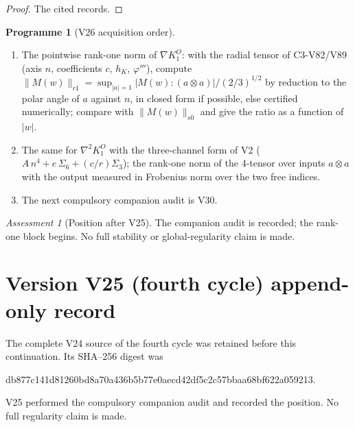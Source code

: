 \documentclass[11pt]{article}
\theoremstyle{plain}
\theoremstyle{definition}
\newtheorem{programme}[theorem]{Programme}
\theoremstyle{remark}
\newtheorem{assessment}[theorem]{Assessment}
\begin{document}
\begin{proof}
The cited records.
\end{proof}

\begin{programme}[V26 acquisition order]
\label{prog:c4v26}
\begin{enumerate}[label=\textup{(AC\arabic*)},leftmargin=4.8em]
\item The pointwise rank-one norm of \(\nabla K^O_1\): with the radial tensor of
      C3-V82/V89 (axis \(n\), coefficients \(c\), \(h_K\), \(\varphi'''\)), compute
      \(\|M(w)\|_{r1}=\sup_{|a|=1}|M(w):(a\otimes a)|/(2/3)^{1/2}\) by reduction to the polar angle of
      \(a\) against \(n\), in closed form if possible, else certified
      numerically; compare with \(\|M(w)\|_{s0}\) and give the ratio as a
      function of \(|w|\).
\item The same for \(\nabla^2K^O_1\) with the three-channel form of V2
      (\(A\,n^4+e\,\Sigma_6+(c/r)\Sigma_3\)); the rank-one norm of the 4-tensor over
      inputs \(a\otimes a\) with the output measured in Frobenius norm over
      the two free indices.
\item The next compulsory companion audit is V30.
\end{enumerate}
\end{programme}

\begin{assessment}[Position after V25]
\label{ass:c4v25-position}
The companion audit is recorded; the rank-one block begins.  No full
stability or global-regularity claim is made.
\end{assessment}

\section*{Version V25 (fourth cycle) append-only record}

The complete V24 source of the fourth cycle was retained before this
continuation.  Its SHA--256 digest was
\begin{center}\scriptsize\ttfamily
db877c141d81260bd8a70a436b5b77e0aecd42df5c2c57bbaa68bf622a059213.
\end{center}
V25 performed the compulsory companion audit and recorded the
position.  No full regularity claim is made.
\end{document}
